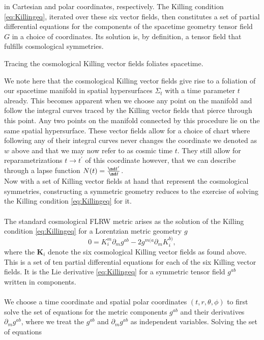 in Cartesian and polar coordinates, respectively. The Killing condition \ref{eq:Killingeq}, iterated over
these six vector fields, then constitutes a set of partial differential equations for the components of the spacetime geometry tensor field $G$ in a choice of coordinates. Its solution
is, by definition, a tensor field that fulfills cosmological symmetries.

\begin{statements}
	Tracing the cosmological Killing vector fields foliates spacetime.
\end{statements}
We note here that the cosmological Killing vector fields give rise to a foliation of
our spacetime manifold in spatial hypersurfaces $Σ_t$ with a time parameter $t$ already. This
becomes apparent when we choose any point on the manifold and follow the integral
curves traced by the Killing vector fields that pierce through this point. Any two points on
the manifold connected by this procedure lie on the same spatial hypersurface. These vector
fields allow for a choice of chart where following any of their integral curves never
changes the coordinate we denoted as $w$ above and that we may now refer to as cosmic
time $t$. They still allow for reparametrizations $t → t^\prime$ of this coordinate however, that we
can describe through a lapse function $N(t)=\frac{\md t^\prime}{\md t}$.\\
Now with a set of Killing vector fields at hand that represent the cosmological symmetries, constructing a symmetric geometry reduces to the exercise of solving the Killing
condition \ref{eq:Killingeq} for it.\\
\\
The standard cosmological FLRW metric arises as the solution of the Killing condition \ref{eq:Killingeq}
for a Lorentzian metric geometry $g$
\begin{equation}
	0=K^m_i  \partial_m g^{ab} - 2 g^{m (a} \partial_m K^{b)}_i,
\end{equation}
where the $\mathbf{K}_i$ denote the six cosmological Killing vector fields as found above. This is a set of ten
partial differential equations for each of the six Killing vector fields. It is the Lie derivative \ref{eq:Killingeq} for a symmetric tensor field $g^{ab}$ written in components.
\\
\\
We choose a time coordinate and spatial polar coordinates $(t, r, θ, ϕ)$ to first solve the set
of equations for the metric components $g^{ab}$ and their derivatives $∂_mg^{ab}$, where we treat the $g^{ab}$ and $∂_mg^{ab}$ as independent variables. Solving the set of equations
